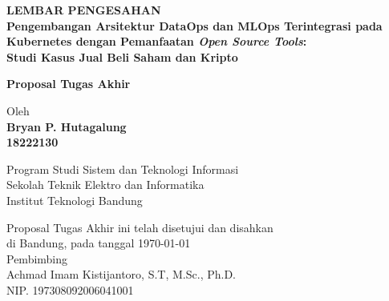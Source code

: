 \documentclass[12pt,a4paper,oneside]{book}
\begin{document}
\newpage
\thispagestyle{empty}
\begin{center}
  \textbf{\large LEMBAR PENGESAHAN}\\[1cm]
    
  {\large\bfseries Pengembangan Arsitektur DataOps dan MLOps Terintegrasi pada Kubernetes dengan Pemanfaatan \textit{Open Source Tools}:\\[0.5em] Studi Kasus Jual Beli Saham dan Kripto}\\
     \vspace{2cm}

  {\Large \textbf{Proposal Tugas Akhir}}\\


  \vspace{1.5cm}
    
    
  {\large Oleh}\\[0.3cm]
    \textbf{
    {\large Bryan P. Hutagalung}\\
    {\large 18222130}
  }\\
    
  \vspace{0.5cm}
 
  {\large Program Studi Sistem dan Teknologi Informasi}\\
  {\large Sekolah Teknik Elektro dan Informatika}\\
  {\large Institut Teknologi Bandung}\\

  \vspace{1.5cm}

  Proposal Tugas Akhir ini telah disetujui dan disahkan\\ 
  di Bandung, pada tanggal \today\\[1cm]

    Pembimbing  \\[3cm]
    Achmad Imam Kistijantoro, S.T, M.Sc., Ph.D.   \\[0.2cm]
    NIP. 197308092006041001

\end{center}

\vspace{1cm}
\noindent

\end{document}
